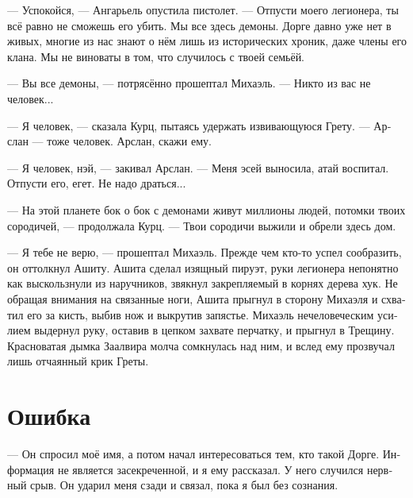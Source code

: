 \documentclass[a4paper,12pt,fleqn]{book}\usepackage{polyglossia}\setdefaultlanguage[babelshorthands=true]{russian}\setotherlanguage{english}\defaultfontfeatures{Ligatures=TeX,Mapping=tex-text}\usepackage{xcolor}\newcommand{\ml}[3]{#2}
\newcommand{\Arythlan}{Aryþlan}
\begin{document}
--- Успокойся, --- Ангарьель опустила пистолет.
\ml{$0$}
{--- Отпусти моего легионера, ты всё равно не сможешь его убить.}
{``Release my leggionaire, you can't kill him anyway.}
\ml{$0$}
{Мы все здесь демоны.}
{We're all daemons here.}
\ml{$0$}
{Дорге давно уже нет в живых, многие из нас знают о нём лишь из исторических хроник, даже члены его клана.}
{Dourgue had gone long ago, most of us know him as but a part of history chronicles, even his kinsmen.}
\ml{$0$}
{Мы не виноваты в том, что случилось с твоей семьёй.}
{We're not responsible for what happened to your family.''}

--- Вы все демоны, --- потрясённо прошептал Михаэль.
\ml{$0$}
{--- Никто из вас не человек...}
{``No one of you is human ...''}

--- Я человек, --- сказала Курц, пытаясь удержать извивающуюся Грету.
\ml{$0$}
{--- Арслан --- тоже человек.}
{``\Arythlan\ is a human too.}
\ml{$0$}
{Арслан, скажи ему.}
{\Arythlan, tell him.''}

\ml{$0$}
{--- Я человек, нэй, --- закивал Арслан.}
{``I am a human, n\ae{},'' \Arythlan\ nodded.}
\ml{$0$}
{--- Меня эсей выносила, атай воспитал.}
{``\textit{\OE{}s\ae{}} carried me, \textit{at\ae{}} teached me.}
\ml{$0$}
{Отпусти его, егет.}
{Let him go, \textit{jeget}.}
\ml{$0$}
{Не надо драться...}
{There is no need in fighting ...''}

--- На этой планете бок о бок с демонами живут миллионы людей, потомки твоих сородичей, --- продолжала Курц.
--- Твои сородичи выжили и обрели здесь дом.

\ml{$0$}
{--- Я тебе не верю, --- прошептал Михаэль.}
{``I don't believe you,'' Michael whispered.}
Прежде чем кто-то успел сообразить, он оттолкнул Ашиту.
Ашита сделал изящный пируэт, руки легионера непонятно как выскользнули из наручников, звякнул закрепляемый в корнях дерева хук.
Не обращая внимания на связанные ноги, Ашита прыгнул в сторону Михаэля и схватил его за кисть, выбив нож и выкрутив запястье.
Михаэль нечеловеческим усилием выдернул руку, оставив в цепком захвате перчатку, и прыгнул в Трещину.
Красноватая дымка Заалвира молча сомкнулась над ним, и вслед ему прозвучал лишь отчаянный крик Греты.

\section{Ошибка}

--- Он спросил моё имя, а потом начал интересоваться тем, кто такой Дорге.
Информация не является засекреченной, и я ему рассказал.
У него случился нервный срыв.
Он ударил меня сзади и связал, пока я был без сознания.
\end{document}
